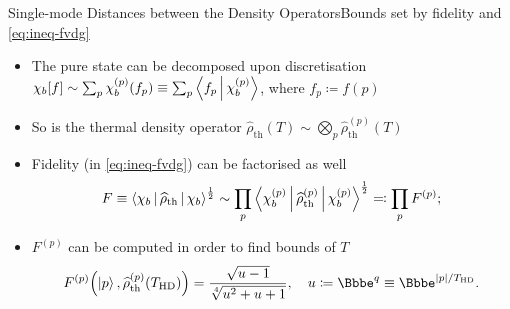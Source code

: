 \documentclass{beamer}
\newcommand{\ee}{{\Bbbe}}
\newcommand{\rbr}[1]{{\left(#1\right)}}
\newcommand{\vbr}[1]{{\left|#1\right|}}
\newcommand{\rfun}[2]{{#1}\mathopen{}\left(#2\right)\mathclose{}}
\newcommand{\sfun}[2]{{#1}\mathopen{}\left[#2\right]\mathclose{}}
\newcommand{\what}[1]{{\widehat{#1}}}
\begin{document}
\begin{frame}[allowframebreaks]{Single-mode Distances between the Density 
Operators}{Bounds set by fidelity and \cref{eq:ineq-fvdg}}

\begin{itemize}


\item The pure state can be decomposed upon discretisation 
$\sfun{\chi_b}{f} \sim \sum_p \rfun{\chi_b^\rbr{p}}{f_p} \equiv \sum_p 
\Braket{f_p | \chi_b^{\rbr{p}}}$, where $f_p \coloneqq \rfun{f}{p}$

\item So is the thermal density operator $\rfun{\what{\rho}_\text{th}}{T} \sim
\bigotimes_p \rfun{\what{\rho}_\text{th}^\rbr{p}}{T}$

\item Fidelity (in \cref{eq:ineq-fvdg}) can be factorised as well
\begin{equation}
F \equiv \Braket{\chi_b | \what{\rho}_\text{th} | \chi_b}^\frac{1}{2} \sim
\prod_p \Braket{\chi_b^{\rbr{p}} | \what{\rho}_\text{th}^{\rbr{p}}
| \chi_b^{\rbr{p}}}^\frac{1}{2} \eqqcolon \prod_p F^{\rbr{p}};
\end{equation}
\item $F^{\rbr{p}}$ can be computed \alert{in order to find bounds of $T$}
\begin{equation}
\rfun{F^{\rbr{p}}}{\Ket{p},\rfun{\what{\rho}_\text{th}^\rbr{p}}{T_\text{HD}}}
= \frac{\sqrt{u-1}}{\sqrt[4]{u^2+u+1}},\quad
u \coloneqq \ee^q \equiv \ee^{\vbr{p}/T_\text{HD}}.
\label{eq:fidelity-pt}
\end{equation}
\end{itemize}

%

\end{frame}
\end{document}
